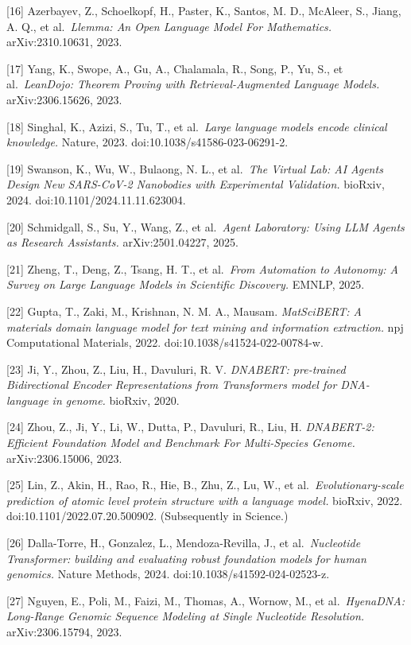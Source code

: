 {[}16{]} Azerbayev, Z., Schoelkopf, H., Paster, K., Santos, M. D., McAleer, S., Jiang, A. Q., et al.~\emph{Llemma: An Open Language Model For Mathematics.} arXiv:2310.10631, 2023.

{[}17{]} Yang, K., Swope, A., Gu, A., Chalamala, R., Song, P., Yu, S., et al.~\emph{LeanDojo: Theorem Proving with Retrieval-Augmented Language Models.} arXiv:2306.15626, 2023.

{[}18{]} Singhal, K., Azizi, S., Tu, T., et al.~\emph{Large language models encode clinical knowledge.} Nature, 2023. doi:10.1038/s41586-023-06291-2.

{[}19{]} Swanson, K., Wu, W., Bulaong, N. L., et al.~\emph{The Virtual Lab: AI Agents Design New SARS-CoV-2 Nanobodies with Experimental Validation.} bioRxiv, 2024. doi:10.1101/2024.11.11.623004.

{[}20{]} Schmidgall, S., Su, Y., Wang, Z., et al.~\emph{Agent Laboratory: Using LLM Agents as Research Assistants.} arXiv:2501.04227, 2025.

{[}21{]} Zheng, T., Deng, Z., Tsang, H. T., et al.~\emph{From Automation to Autonomy: A Survey on Large Language Models in Scientific Discovery.} EMNLP, 2025.

{[}22{]} Gupta, T., Zaki, M., Krishnan, N. M. A., Mausam. \emph{MatSciBERT: A materials domain language model for text mining and information extraction.} npj Computational Materials, 2022. doi:10.1038/s41524-022-00784-w.

{[}23{]} Ji, Y., Zhou, Z., Liu, H., Davuluri, R. V. \emph{DNABERT: pre-trained Bidirectional Encoder Representations from Transformers model for DNA-language in genome.} bioRxiv, 2020.

{[}24{]} Zhou, Z., Ji, Y., Li, W., Dutta, P., Davuluri, R., Liu, H. \emph{DNABERT-2: Efficient Foundation Model and Benchmark For Multi-Species Genome.} arXiv:2306.15006, 2023.

{[}25{]} Lin, Z., Akin, H., Rao, R., Hie, B., Zhu, Z., Lu, W., et al.~\emph{Evolutionary-scale prediction of atomic level protein structure with a language model.} bioRxiv, 2022. doi:10.1101/2022.07.20.500902. (Subsequently in Science.)

{[}26{]} Dalla-Torre, H., Gonzalez, L., Mendoza-Revilla, J., et al.~\emph{Nucleotide Transformer: building and evaluating robust foundation models for human genomics.} Nature Methods, 2024. doi:10.1038/s41592-024-02523-z.

{[}27{]} Nguyen, E., Poli, M., Faizi, M., Thomas, A., Wornow, M., et al.~\emph{HyenaDNA: Long-Range Genomic Sequence Modeling at Single Nucleotide Resolution.} arXiv:2306.15794, 2023.

